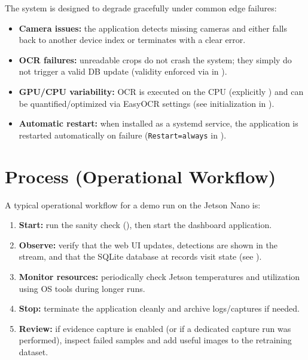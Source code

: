 \noindent
The system is designed to degrade gracefully under common edge failures:
\begin{itemize}
	\item \textbf{Camera issues:} the application detects missing cameras and either falls back to another device index or terminates with a clear error.
	\item \textbf{OCR failures:} unreadable crops do not crash the system; they simply do not trigger a valid DB update (validity enforced via  in ).
	\item \textbf{GPU/CPU variability:} OCR is executed on the CPU (explicitly ) and can be quantified/optimized via EasyOCR settings (see initialization in\linebreak
	).
	\item \textbf{Automatic restart:} when installed as a systemd service, the application is restarted automatically on failure (\texttt{Restart=always} in ).
\end{itemize}

\section{Process (Operational Workflow)}

\noindent
A typical operational workflow for a demo run on the Jetson Nano is:
\begin{enumerate}
	\item \textbf{Start:} run the sanity check (), then start the dashboard application.
	\item \textbf{Observe:} verify that the web UI updates, detections are shown in the stream, and that the SQLite database at  records visit state (see ).
	\item \textbf{Monitor resources:} periodically check Jetson temperatures and utilization using OS tools during longer runs.
	\item \textbf{Stop:} terminate the application cleanly and archive logs/captures if needed.
	\item \textbf{Review:} if evidence capture is enabled (or if a dedicated capture run was performed), inspect failed samples and add useful images to the retraining dataset.
\end{enumerate}

